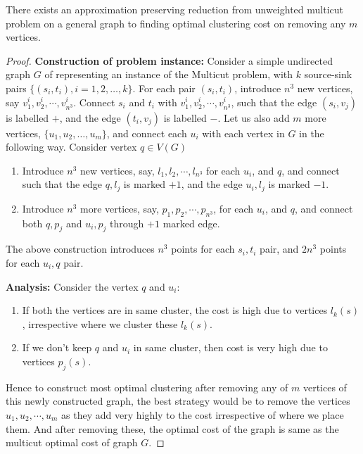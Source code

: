 \begin{lemma}\label{bi-criterion-hardness-01}
There exists an approximation preserving reduction from unweighted multicut problem on a general graph to finding optimal clustering cost on removing any $m$ vertices.
\end{lemma}
\begin{proof}
\textbf{Construction of problem instance:} Consider a simple undirected graph $G$ of representing an instance of the Multicut problem, with $k$ source-sink pairs $\{ (s_i,t_i), i =1,2,\dots,k \}$. For each pair $(s_i,t_i)$, introduce $n^3$ new vertices, say $v_1^i,v_2^i,\cdots, v_{n^3}^i$. Connect $s_i$ and $t_i$ with $v_1^i,v_2^i,\cdots, v_{n^3}^i$, such that the edge $(s_i,v_j)$ is labelled $+$, and the edge $(t_i,v_j)$ is labelled $-$. Let us also add $m$ more vertices, $\{ u_1,u_2,\dots,u_m \}$, and connect each $u_i$ with each vertex in $G$ in the following way. Consider vertex $q \in V(G)$
\begin{enumerate}
    \item Introduce $n^3$ new vertices, say, $l_1,l_2,\cdots, l_{n^3}$ for each $u_i$, and $q$, and connect such that the edge $q,l_j$ is marked $+1$, and the edge $u_i,l_j$ is marked $-1$.
    \item Introduce $n^3$ more vertices, say, $p_1,p_2,\cdots,p_{n^3}$, for each $u_i$, and $q$, and connect both $q,p_j$ and $u_i,p_j$ through $+1$ marked edge.
\end{enumerate}
The above construction introduces $n^3$ points for each $s_i,t_i$ pair, and $2n^3$ points for each $u_i, q$ pair.

\textbf{Analysis:} Consider the vertex $q$ and $u_i$:
\begin{enumerate}
    \item If both the vertices are in same cluster, the cost is high due to vertices $l_k(s)$, irrespective where we cluster these $l_k(s)$.
    \item If we don't keep $q$ and $u_i$ in same cluster, then cost is very high due to vertices $p_j(s)$.
\end{enumerate}
Hence to construct most optimal clustering after removing any of $m$ vertices of this newly constructed graph, the best strategy would be to remove the vertices $u_1,u_2,\cdots,u_m$ as they add very highly to the cost irrespective of where we place them. And after removing these, the optimal cost of the graph is same as the multicut optimal cost of graph $G$.

\end{proof}
